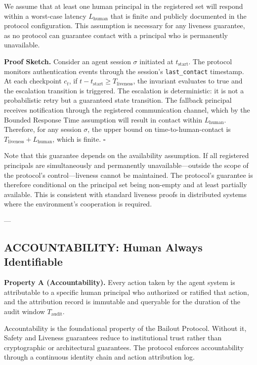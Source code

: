 \begin{assumption}
We assume that at least one human principal in the registered set will respond within a worst-case latency $L_{\text{human}}$ that is finite and publicly documented in the protocol configuration. This assumption is necessary for any liveness guarantee, as no protocol can guarantee contact with a principal who is permanently unavailable.
\end{assumption}

\textbf{Proof Sketch.} Consider an agent session $\sigma$ initiated at $t_{\text{start}}$. The protocol monitors authentication events through the session's \texttt{last\_contact} timestamp. At each checkpoint $c_t$, if $t - t_{\text{start}} \geq T_{\text{liveness}}$, the invariant evaluates to true and the escalation transition is triggered. The escalation is deterministic: it is not a probabilistic retry but a guaranteed state transition. The fallback principal receives notification through the registered communication channel, which by the Bounded Response Time assumption will result in contact within $L_{\text{human}}$. Therefore, for any session $\sigma$, the upper bound on time-to-human-contact is $T_{\text{liveness}} + L_{\text{human}}$, which is finite. $\square$

Note that this guarantee depends on the availability assumption. If all registered principals are simultaneously and permanently unavailable—outside the scope of the protocol's control—liveness cannot be maintained. The protocol's guarantee is therefore conditional on the principal set being non-empty and at least partially available. This is consistent with standard liveness proofs in distributed systems where the environment's cooperation is required.

---

\subsection{ACCOUNTABILITY: Human Always Identifiable}

\textbf{Property A (Accountability).} Every action taken by the agent system is attributable to a specific human principal who authorized or ratified that action, and the attribution record is immutable and queryable for the duration of the audit window $T_{\text{audit}}$.

Accountability is the foundational property of the Bailout Protocol. Without it, Safety and Liveness guarantees reduce to institutional trust rather than cryptographic or architectural guarantees. The protocol enforces accountability through a continuous identity chain and action attribution log.

